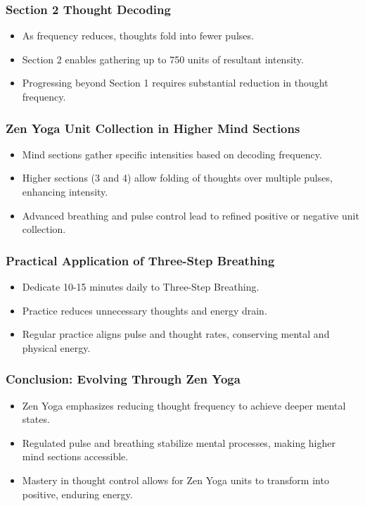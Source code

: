 \begin{frame}[fragile]\frametitle{Section 2 Thought Decoding}
    \begin{itemize}
        \item As frequency reduces, thoughts fold into fewer pulses.
        \item Section 2 enables gathering up to 750 units of resultant intensity.
        \item Progressing beyond Section 1 requires substantial reduction in thought frequency.
    \end{itemize}
\end{frame}

\begin{frame}[fragile]\frametitle{Zen Yoga Unit Collection in Higher Mind Sections}
    \begin{itemize}
        \item Mind sections gather specific intensities based on decoding frequency.
        \item Higher sections (3 and 4) allow folding of thoughts over multiple pulses, enhancing intensity.
        \item Advanced breathing and pulse control lead to refined positive or negative unit collection.
    \end{itemize}
\end{frame}

\begin{frame}[fragile]\frametitle{Practical Application of Three-Step Breathing}
    \begin{itemize}
        \item Dedicate 10-15 minutes daily to Three-Step Breathing.
        \item Practice reduces unnecessary thoughts and energy drain.
        \item Regular practice aligns pulse and thought rates, conserving mental and physical energy.
    \end{itemize}
\end{frame}

\begin{frame}[fragile]\frametitle{Conclusion: Evolving Through Zen Yoga}
    \begin{itemize}
        \item Zen Yoga emphasizes reducing thought frequency to achieve deeper mental states.
        \item Regulated pulse and breathing stabilize mental processes, making higher mind sections accessible.
        \item Mastery in thought control allows for Zen Yoga units to transform into positive, enduring energy.
    \end{itemize}
\end{frame}

